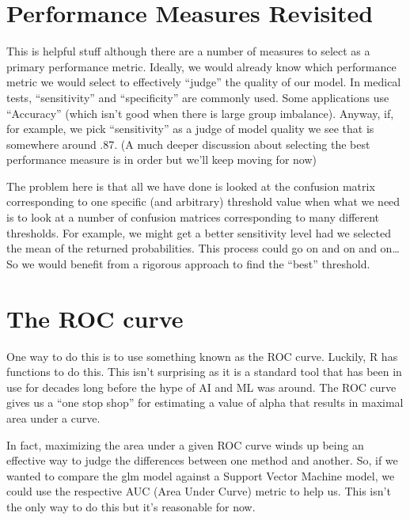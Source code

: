 \documentclass[
]{book}
\begin{document}
\hypertarget{performance-measures-revisited}{%
\section{Performance Measures Revisited}\label{performance-measures-revisited}}

This is helpful stuff although there are a number of measures to select as a primary performance metric. Ideally, we would already know which performance metric we would select to effectively ``judge'' the quality of our model. In medical tests, ``sensitivity'' and ``specificity'' are commonly used. Some applications use ``Accuracy'' (which isn't good when there is large group imbalance). Anyway, if, for example, we pick ``sensitivity'' as a judge of model quality we see that is somewhere around .87.
(A much deeper discussion about selecting the best performance measure is in order but we'll keep moving for now)

The problem here is that all we have done is looked at the confusion matrix corresponding to one specific (and arbitrary) threshold value when what we need is to look at a number of confusion matrices corresponding to many different thresholds. For example, we might get a better sensitivity level had we selected the mean of the returned probabilities. This process could go on and on and on\ldots{} So we would benefit from a rigorous approach to find the ``best'' threshold.

\hypertarget{the-roc-curve}{%
\section{The ROC curve}\label{the-roc-curve}}

One way to do this is to use something known as the ROC curve. Luckily, R has functions to do this. This isn't surprising as it is a standard tool that has been in use for decades long before the hype of AI and ML was around. The ROC curve gives us a ``one stop shop'' for estimating a value of alpha that results in maximal area under a curve.

In fact, maximizing the area under a given ROC curve winds up being an effective way to judge the differences between one method and another. So, if we wanted to compare the glm model against a Support Vector Machine model, we could use the respective AUC (Area Under Curve) metric to help us. This isn't the only way to do this but it's reasonable for now.
\end{document}
